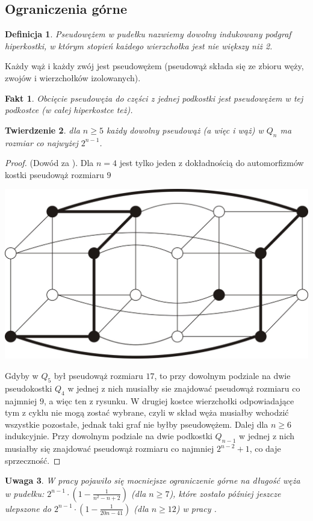 \documentclass{pracamgr}
\newtheorem{defi}{Definicja}[section] %
\newtheorem{theorem}{Twierdzenie}
\newtheorem{remark}[theorem]{Uwaga}
\newtheorem{fact}[theorem]{Fakt}
\begin{document}
    \subsection{Ograniczenia górne}
     \begin{defi}\label{pseudowąż}
      \emph{Pseudowężem} w pudełku nazwiemy dowolny indukowany podgraf hiperkostki, w którym stopień każdego wierzchołka jest nie większy niż 2. 
     \end{defi}
     Każdy wąż i każdy zwój jest pseudowężem (pseudowąż składa się ze zbioru węży, zwojów i wierzchołków izolowanych).
     \begin{fact}
      Obcięcie pseudowęża do części z jednej podkostki jest pseudowężem w tej podkostce (w całej hiperkostce też).
     \end{fact}
    \begin{theorem}
     dla $n\ge5$ każdy dowolny pseudowąż (a więc i wąż) w $Q_n$ ma rozmiar co najwyżej $2^{n-1}$.
    \end{theorem}
    \begin{proof}
     (Dowód za \cite{Snake1}).
     Dla $n=4$ jest tylko jeden z dokładnością do automorfizmów kostki pseudowąż rozmiaru $9$
     \begin{center}
      \includegraphics[scale=0.4]{img/pseudoS_4.jpg}
     \end{center}
     Gdyby w $Q_5$ był pseudowąż rozmiaru $17$, to przy dowolnym podziale na dwie pseudokostki $Q_4$ w jednej z nich musiałby sie znajdować pseudowąż
     rozmiaru co najmniej $9$, a więc ten z rysunku. W drugiej kostce wierzchołki odpowiadające tym z cyklu nie mogą zostać wybrane,
     czyli w skład węża musiałby wchodzić wszystkie pozostałe, jednak taki graf nie byłby pseudowężem.\newline
     Dalej dla $n\ge6$ indukcyjnie. Przy dowolnym podziale na dwie podkostki $Q_{n-1}$ w jednej z nich musiałby się znajdować pseudowąż rozmiaru co najmniej
     $2^{n-2}+1$, co daje sprzeczność.
    \end{proof}
    \begin{remark}
     W pracy \cite{Snake3} pojawiło się mocniejsze ograniczenie górne na długość węża w pudełku:
     $2^{n-1}\cdot(1-\frac{1}{n^2-n+2})$ (dla $n\ge7$), które zostało później jeszcze ulepszone do\newline
     $2^{n-1}\cdot(1-\frac{1}{20n-41})$ (dla $n\ge12$) w pracy \cite{Snake4}.
    \end{remark}
\end{document}
